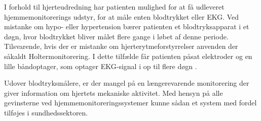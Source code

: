 \noindent I forhold til hjerteudredning har patienten mulighed for at få udleveret hjemmemonitorerings udstyr, for at måle enten blodtrykket eller EKG. Ved mistanke om hypo- eller hypertension bærer patienten et blodtryksapparat i et døgn, hvor blodtrykket bliver målet flere gange i løbet af denne periode. Tilsvarende, hvis der er mistanke om hjerterytmeforstyrrelser anvenden der såkaldt Holtermonitorering. I dette tilfælde får patienten påsat elektroder og en lille båndoptager, som optager EKG-signal i op til flere døgn \cite{hjerud}.
 
Udover blodtryksmålere, er der mangel på en længerevarende monitorering der giver information om hjertets mekaniske aktivitet. Med hensyn på alle gevinsterne ved hjemmemonitoreringssystemer kunne sådan et system med fordel tilføjes i sundhedssektoren.